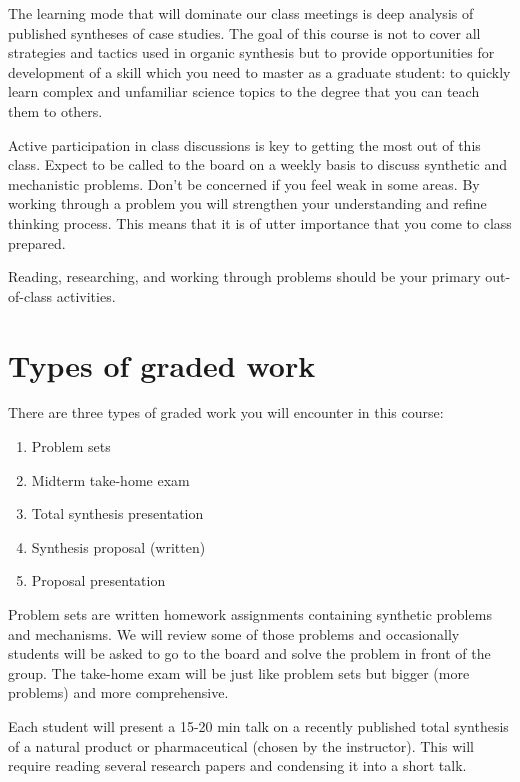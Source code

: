 The learning mode that will dominate our class meetings is deep analysis
of published syntheses of case studies. The goal of this course is not
to cover all strategies and tactics used in organic synthesis but to
provide opportunities for development of a skill which you need to
master as a graduate student: to quickly learn complex and unfamiliar
science topics to the degree that you can teach them to others.

Active participation in class discussions is key to getting the most out
of this class. Expect to be called to the board on a weekly basis to
discuss synthetic and mechanistic problems. Don't be concerned if you
feel weak in some areas. By working through a problem you will
strengthen your understanding and refine thinking process. This means
that it is of utter importance that you come to class prepared.

Reading, researching, and working through problems should be your
primary out-of-class activities.

\hypertarget{types-of-graded-work}{%
\section{Types of graded work}\label{types-of-graded-work}}

There are three types of graded work you will encounter in this course:

\begin{enumerate}
\def\labelenumi{\arabic{enumi}.}
\tightlist
\item
  Problem sets
\item
  Midterm take-home exam
\item
  Total synthesis presentation
\item
  Synthesis proposal (written)
\item
  Proposal presentation
\end{enumerate}

Problem sets are written homework assignments containing synthetic
problems and mechanisms. We will review some of those problems and
occasionally students will be asked to go to the board and solve the
problem in front of the group. The take-home exam will be just like
problem sets but bigger (more problems) and more comprehensive.

Each student will present a 15-20 min talk on a recently published total
synthesis of a natural product or pharmaceutical (chosen by the
instructor). This will require reading several research papers and
condensing it into a short talk.

